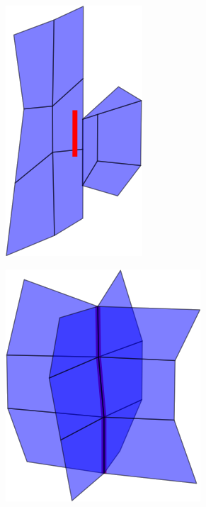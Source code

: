 \begin{figure}[p]
\begin{center}
\begin{subfigure}[b]{.45\textwidth}
\end{subfigure}
\begin{subfigure}[b]{.45\textwidth}
\centering
\includegraphics[height = .17\textheight, width = .5\textwidth,keepaspectratio]{Pictures/SurfaceReconstruction/3DManifoldIIRes}
\end{subfigure}
\begin{subfigure}[b]{.45\textwidth}
\centering
\includegraphics[height = .17\textheight, width = .5\textwidth,keepaspectratio]{Pictures/SurfaceReconstruction/3DManifoldMM}
\end{subfigure}
\begin{subfigure}[b]{.45\textwidth}
\centering

\end{subfigure}
\end{center}
\end{figure}

